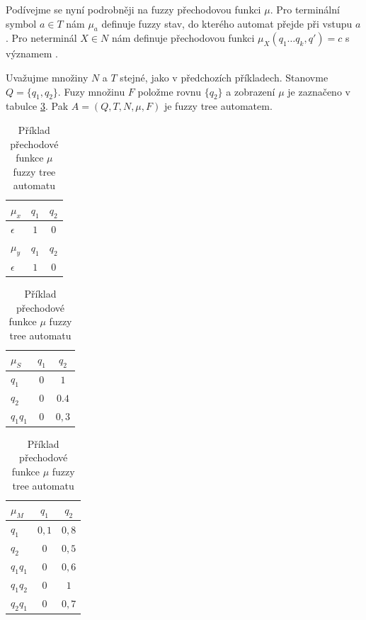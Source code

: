 \documentclass[a4paper,10pt]{article}
\begin{document}
Podívejme se nyní podrobněji na fuzzy přechodovou funkci $\mu$. Pro terminální symbol $a \in T$ nám $\mu_a$ definuje fuzzy stav, do kterého automat přejde při vstupu $a$. Pro neterminál $X \in N$ nám definuje přechodovou funkci $\mu_X(q_1 \dots q_k, q') = c$ s významem . 

\begin{example}
 Uvažujme množiny $N$ a $T$ stejné, jako v předchozích příkladech. Stanovme $Q = \{ q_1, q_2 \}$. Fuzy množinu $F$ položme rovnu $\{ q_2 \}$ a zobrazení $\mu$ je zaznačeno v tabulce \ref{tab:MuOfFuzTreAut}. Pak $A = (Q, T, N, \mu, F)$ je fuzzy tree automatem.
\end{example}

\begin{table}
 \begin{subtable}[t]{0.3\textwidth}
  \begin{tabular}{|l||c|c|}
    \hline 
    $\mu_x$		& $q_1$	& $q_2$	\\
    \hline
    $\epsilon$		& $1$	& $0$	\\
    \hline \hline
  
    $\mu_y$		& $q_1$	& $q_2$	\\
    \hline
    $\epsilon$		& $1$	& $0$	\\
    \hline
  \end{tabular}
 \end{subtable}
%
  \begin{subtable}[t]{0.3\textwidth}
    \begin{tabular}{|l||c|c|}
      \hline 
      $\mu_S$		& $q_1$	& $q_2$	\\
      \hline
      $q_1$		& $0$	& $1$	\\
      $q_2$		& $0$	& $0.4$	\\
      $q_1 q_1$		& $0$	& $0,3$	\\  
      \hline
    \end{tabular}
  \end{subtable}
%
  \begin{subtable}[t]{0.3\textwidth}
    \begin{tabular}{|l||c|c|}
      \hline 
      $\mu_M$		& $q_1$	& $q_2$	\\
      \hline
      $q_1$		& $0,1$	& $0,8$	\\
      $q_2$		& $0$	& $0,5$	\\
      $q_1 q_1$		& $0$	& $0,6$	\\
      $q_1 q_2$		& $0$	& $1$	\\
      $q_2 q_1$		& $0$	& $0,7$	\\
      \hline 
    \end{tabular}
  \end{subtable}
  
  \caption{Příklad přechodové funkce $\mu$ fuzzy tree automatu} \label{tab:MuOfFuzTreAut}
\end{table}
\end{document}
